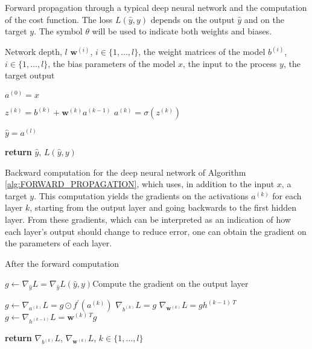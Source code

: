 \begin{algorithm}[H]
\caption{Forward propagation through a typical deep neural network and the computation of the cost function. The loss $L(\hat{y},y)$ depends on the output $\hat{y}$ and on the target $y$. The symbol $\theta$ will be used to indicate both weights and biases.}\label{alg:FORWARD_PROPAGATION}
\begin{algorithmic}[1]
\Require Network depth, $l$
\Require $\mathbf{w}^{(i)}$, $i \in \{1,\dots,l\}$, the weight matrices of the model
\Require $b^{(i)}$, $i \in \{1,\dots,l\}$, the bias parameters of the model
\Require $x$, the input to the process
\Require $y$, the target output


\State $a^{(0)} = x$

\State $z^{(k)} = b^{(k)} + \mathbf{w}^{(k)} a^{(k-1)}$
\State $a^{(k)} = \sigma(z^{(k)})$
\EndFor

\State $\hat{y} = a^{(l)}$

\State \textbf{return} $\hat{y}$, $L(\hat{y},y)$
\EndProcedure
\end{algorithmic}
\end{algorithm}


\begin{algorithm}[H]
\caption{Backward computation for the deep neural network of Algorithm \ref{alg:FORWARD_PROPAGATION}, which uses, in addition to the input $x$, a target $y$. This computation yields the gradients on the activations $a^{(k)}$ for each layer $k$, starting from the output layer and going backwards to the first hidden layer. From these gradients, which can be interpreted as an indication of how each layer's output should change to reduce error, one can obtain the gradient on the parameters of each layer.}\label{alg:BACKWARD_COMPUTATION}
\begin{algorithmic}[1]
 \Comment After the forward computation

\State $g \gets \nabla_{\hat{y}}L = \nabla_{\hat{y}}L(\hat{y},y)$\Comment Compute the gradient on the output layer

\State $g \gets \nabla_{a^{(k)}}L = g \odot f^{\prime}(a^{(k)})$
\State $\nabla_{b^{(k)}}L = g$
\State $\nabla_{\mathbf{w}^{(k)}}L = g h^{(k-1)~T}$
\State $g \gets \nabla_{h^{(k-1)}}L = \mathbf{w}^{(k)~T} g$
\EndFor

\State \textbf{return} $\nabla_{b^{(k)}}L$, $\nabla_{\mathbf{w}^{(k)}}L$, $k \in \{1,\dots,l\}$
\EndProcedure
\end{algorithmic}
\end{algorithm}





